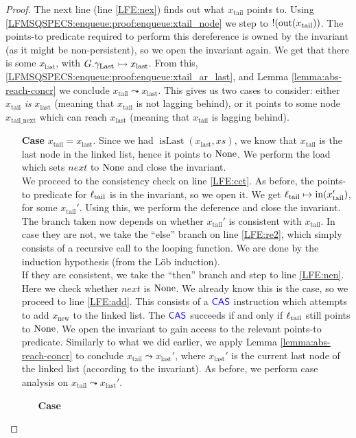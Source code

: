 \documentclass[a4paper, 10pt]{report}
\theoremstyle{definition}
\newcommand{\xsc}{xs}
\newcommand{\isLast}{\operatorname{isLast}}
\newcommand{\locN}[1]{\loc_{\mathrm{#1}}}
\newcommand{\loctail}{\locN{tail}}
\newcommand{\nIn}[1]{\operatorname{in}(#1)}
\newcommand{\nOut}[1]{\operatorname{out}(#1)}
\newcommand{\node}{x}
\newcommand{\nodeN}[1]{\node_{\mathrm{#1}}}
\newcommand{\nodetail}{\nodeN{tail}}
\newcommand{\nodelast}{\nodeN{last}}
\newcommand{\nodenew}{\nodeN{new}}
\newcommand{\nodetailnext}{\nodeN{tail\_next}}
\newcommand{\Qg}{G}
\newcommand{\glast}{\gname_{\mathrm{Last}}}
\newcommand{\reach}[2]{#1 \leadsto #2}
\newcommand{\ap}[2]{#1 \rightarrowtail #2}
\begin{document}
\begin{proof}
  The next line (line \ref{LFE:nex}) finds out what $\nodetail$ points to. Using \ref{LFMSQSPECS:enqueue:proof:enqueue:xtail_node} we step to $\deref (\nOut{\nodetail})$. The points-to predicate required to perform this dereference is owned by the invariant (as it might be non-persistent), so we open the invariant again. We get that there is some $\nodelast$, with $\ap{\Qg.\glast}{\nodelast}$. From this, \ref{LFMSQSPECS:enqueue:proof:enqueue:xtail_ar_last}, and Lemma \ref{lemma:abs-reach-concr} we conclude $\reach{\nodetail}{\nodelast}$. This gives us two cases to consider: either $\nodetail$ \textit{is} $\nodelast$ (meaning that $\nodetail$ is not lagging behind), or it points to some node $\nodetailnext$ which can reach $\nodelast$ (meaning that $\nodetail$ is lagging behind).
  \begin{itemize}
    \item[\textbf{Case}]
    $\nodetail = \nodelast$. Since we had $\isLast(\nodelast, \xsc)$, we know that $\nodetail$ is the last node in the linked list, hence it points to $\operatorname{None}$. We perform the load which sets $next$ to $\operatorname{None}$ and close the invariant.\\
    We proceed to the consistency check on line \ref{LFE:cct}. As before, the points-to predicate for $\loctail$ is in the invariant, so we open it. We get $\loctail \mapsto \nIn{\nodetail'}$, for some $\nodetail'$. Using this, we perform the deference and close the invariant. The branch taken now depends on whether $\nodetail'$ is consistent with $\nodetail$. In case they are not, we take the ``else'' branch on line \ref{LFE:re2}, which simply consists of a recursive call to the looping function. We are done by the induction hypothesis (from the Löb induction).\\
    If they are consistent, we take the ``then'' branch and step to line \ref{LFE:nen}. Here we check whether $next$ is $\operatorname{None}$. We already know this is the case, so we proceed to line \ref{LFE:add}. This consists of a $\textsf{\color{blue} CAS}$ instruction which attempts to add $\nodenew$ to the linked list. The $\textsf{\color{blue} CAS}$ succeeds if and only if $\loctail$ still points to $\operatorname{None}$. We open the invariant to gain access to the relevant points-to predicate. Similarly to what we did earlier, we apply Lemma \ref{lemma:abs-reach-concr} to conclude $\reach{\nodetail}{\nodelast'}$, where $\nodelast'$ is the current last node of the linked list (according to the invariant). As before, we perform case analysis on $\reach{\nodetail}{\nodelast'}$.
    \begin{itemize}
      \item[\textbf{Case}]

\end{itemize}
\end{itemize}
\end{proof}
\end{document}

